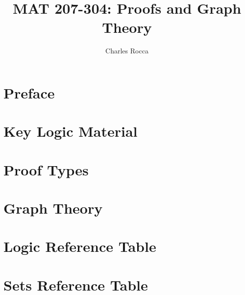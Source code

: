 \documentclass[12pt,twoside]{book}
\title{MAT 207-304: Proofs and Graph Theory}
\author{Charles Rocca}
\begin{document}
\maketitle


\setcounter{tocdepth}{1}
\tableofcontents

\chapter*{Preface}
    
\cleardoublepage


\chapter{Key Logic Material}
    
\cleardoublepage

\chapter{Proof Types}
    
\cleardoublepage

\chapter{Graph Theory}
    
\cleardoublepage


\appendix

\chapter{Logic Reference Table}
    
\cleardoublepage

\chapter{Sets Reference Table}
    
\cleardoublepage

\nocite{rosen2006discrete}
\nocite{grimaldi1994discrete}
\nocite{lin1985set}
\nocite{OEIS}

\printbibliography[heading=bibintoc,]

\printindex
\end{document}
